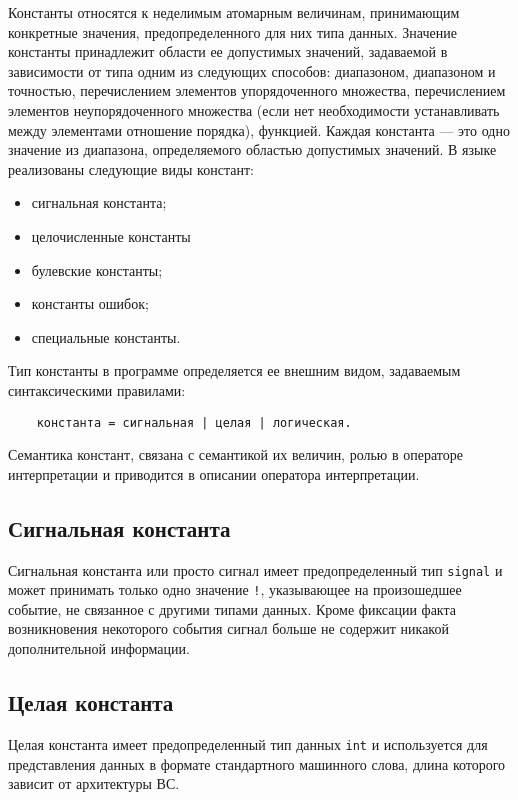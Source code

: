 {Константы относятся к неделимым атомарным величинам, принимающим конкретные значения, предопределенного для них типа данных. Значение константы принадлежит области ее допустимых значений, задаваемой в зависимости от типа одним из следующих способов: диапазоном, диапазоном и точностью, перечислением элементов упорядоченного множества, перечислением элементов неупорядоченного множества (если нет необходимости устанавливать между элементами отношение порядка), функцией. Каждая константа --- это одно значение из диапазона, определяемого областью допустимых значений. В языке реализованы следующие виды констант:

\begin{itemize}
	\item сигнальная константа;
	\item целочисленные константы
	\item булевские константы;
	\item константы ошибок;
	\item специальные константы.
\end{itemize}

Тип константы в программе определяется ее внешним видом, задаваемым синтаксическими правилами:

\begin{verbatim}
    константа = сигнальная | целая | логическая.
\end{verbatim}

Семантика констант, связана с семантикой их величин, ролью в операторе интерпретации и приводится в описании оператора интерпретации.

\subsection{Сигнальная константа}
\label{smile:const:signal}

Сигнальная константа или просто сигнал имеет предопределенный тип \verb|signal| и может принимать только одно значение \verb|!|, указывающее на произошедшее событие, не связанное с другими типами данных. Кроме фиксации факта возникновения некоторого события сигнал больше не содержит никакой дополнительной информации.

\subsection{Целая константа}
\label{smile:const:int}

Целая константа имеет предопределенный тип данных \verb|int| и используется для представления данных в формате стандартного машинного слова, длина которого зависит от архитектуры ВС.

}
